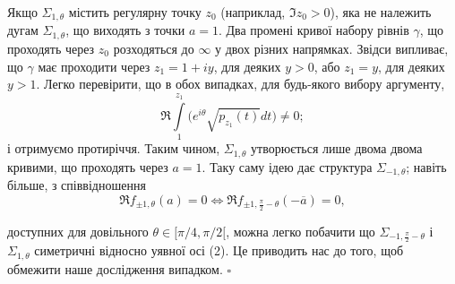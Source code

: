 \documentclass[a4paper]{article}
\newcommand{\dint}{\displaystyle\int}
\begin{document}
    Якщо $\Sigma_{1,\theta}$ містить регулярну точку $z_0$ (наприклад, $\Im z_0 > 0$), яка не
    належить дугам $\Sigma_{1,\theta}$, що виходять з точки $a = 1$. Два промені кривої набору
    рівнів $\gamma$, що проходять через $z_0$ розходяться до $\infty$ у двох різних напрямках.
    Звідси випливає, що $\gamma$ має проходити через $z_1=1+iy$, для деяких $y > 0$,
    або $z_1 = y$, для деяких $y > 1$. Легко перевірити, що в обох випадках, для
    будь-якого вибору аргументу,
    $$\mathfrak{R}\dint\limits_{1}^{z_1}\Biggl(e^{i\theta}\sqrt{p_{z_1}(t)}dt\Biggr)\ne0;$$
    і отримуємо протиріччя. Таким чином, $\Sigma_{1,\theta}$ утворюється лише двома двома
    кривими, що проходять через $a = 1$. Таку саму ідею дає структура $\Sigma_{-1,\theta}$;
    навіть більше, з співвідношення
    \begin{equation}
        \mathfrak{R}f_{\pm1,\theta}(a)=0\Longleftrightarrow \mathfrak{R}f_{\pm1,\frac{\pi}{2}-\theta}(-\overline{a})=0,
    \end{equation}

\newpage
\noindent
    доступних для довільного $\theta\in [\pi/4, \pi/2[$, можна легко побачити що $\Sigma_{-1,\frac{\pi}{2}-\theta}$
    і $\Sigma_{1,\theta}$ симетричні відносно уявної осі (2). Це приводить нас до того, щоб
    обмежити наше дослідження випадком. \hfill $\square$
\end{document}
